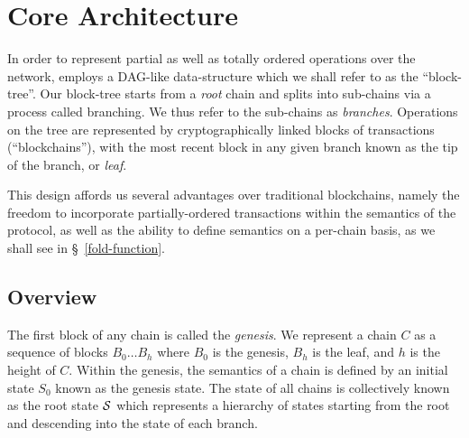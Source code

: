 \section{Core Architecture}
\label{s:core-architecture}


In order to represent partial as well as totally ordered operations over the
network, \oscoin{} employs a DAG-like data-structure which we shall refer to as
the ``block-tree''.  Our block-tree starts from a \emph{root} chain and splits
into sub-chains via a process called branching. We thus refer to the sub-chains as
\emph{branches}.  Operations on the tree are represented by cryptographically
linked blocks of transactions (``blockchains''), with the most recent block in
any given branch known as the tip of the branch, or \emph{leaf}.

This design affords us several advantages over traditional blockchains, namely
the freedom to incorporate partially-ordered transactions within the semantics
of the protocol, as well as the ability to define semantics on a per-chain
basis, as we shall see in \S~\ref{fold-function}.




\subsection{Overview}

The first block of any chain is called the \emph{genesis}. We represent a chain
$C$ as a sequence of blocks $B_0 \dots B_h$ where $B_0$ is the genesis,
$B_h$ is the leaf, and $h$ is the height of $C$. Within the genesis, the
semantics of a chain is defined by an initial state $S_0$ known as the
genesis state. The state of all chains is collectively known as the root state
$\mathcal{S}$ which represents a hierarchy of states starting from the root
and descending into the state of each branch.


